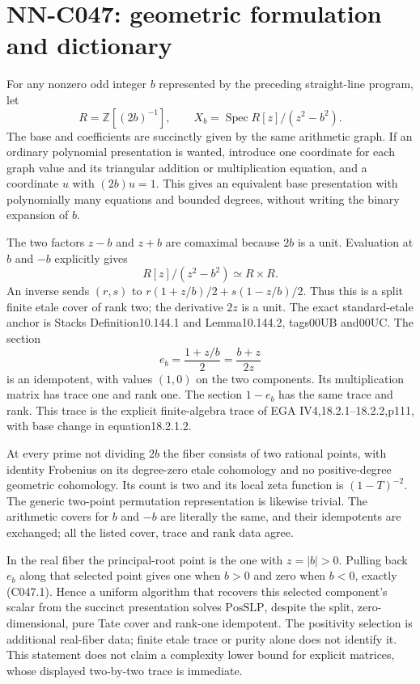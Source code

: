 \section{NN-C047: geometric formulation and dictionary}
\begin{geometricstatement}[NN-C047]
For any nonzero odd integer $b$ represented by the preceding
straight-line program, let
\[
 R=\mathbb Z[(2b)^{-1}],\qquad
 X_b=\operatorname{Spec}R[z]/(z^2-b^2).
\]
The base and coefficients are succinctly given by the same
arithmetic graph. If an ordinary polynomial presentation is
wanted, introduce one coordinate for each graph value and its
triangular addition or multiplication equation, and a coordinate
$u$ with $(2b)u=1$. This gives an equivalent base presentation
with polynomially many equations and bounded degrees, without
writing the binary expansion of $b$.

The two factors $z-b$ and $z+b$ are comaximal because $2b$ is a
unit. Evaluation at $b$ and $-b$ explicitly gives
\[
                  R[z]/(z^2-b^2)\simeq R\times R.
\]
An inverse sends $(r,s)$ to
$r(1+z/b)/2+s(1-z/b)/2$. Thus this is a split finite etale cover
of rank two; the derivative $2z$ is a unit. The exact standard-etale
anchor is Stacks Definition10.144.1 and Lemma10.144.2,
tags00UB and00UC. The section
\[
               e_b=\frac{1+z/b}{2}
                   =\frac{b+z}{2z}
\]
is an idempotent, with values $(1,0)$ on the two components.
Its multiplication matrix has trace one and rank one. The section
$1-e_b$ has the same trace and rank. This trace is the explicit
finite-algebra trace of EGA IV4,18.2.1--18.2.2,p111,
with base change in equation18.2.1.2.

At every prime not dividing $2b$ the fiber consists of two rational
points, with identity Frobenius on its degree-zero etale
cohomology and no positive-degree geometric cohomology. Its
count is two and its local zeta function is $(1-T)^{-2}$.
The generic two-point permutation representation is likewise
trivial. The arithmetic covers for $b$ and $-b$ are literally the
same, and their idempotents are exchanged; all the listed cover,
trace and rank data agree.

In the real fiber the principal-root point is the one with
$z=|b|>0$. Pulling back $e_b$ along that selected point gives one
when $b>0$ and zero when $b<0$, exactly (C047.1). Hence a uniform
algorithm that recovers this selected component's scalar from the
succinct presentation solves $\mathrm{PosSLP}$, despite the
split, zero-dimensional, pure Tate cover and rank-one idempotent.
The positivity selection is additional real-fiber data; finite
etale trace or purity alone does not identify it. This statement
does not claim a complexity lower bound for explicit matrices,
whose displayed two-by-two trace is immediate.


\end{geometricstatement}
